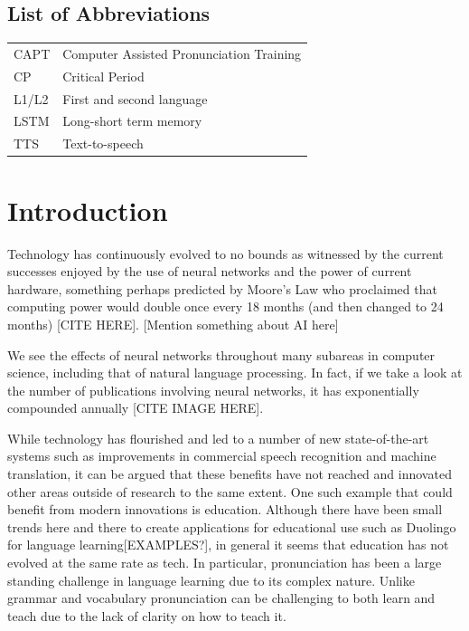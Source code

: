 \documentclass
[
    a4paper,
    twoside,
    12pt
]
{report}
\begin{document}
\section*{List of Abbreviations}\begin{tabular}{ll}
    CAPT    & Computer Assisted Pronunciation Training \\
    CP      & Critical Period \\
    L1/L2    & First and second language \\
    LSTM & Long-short term memory \\
    TTS   & Text-to-speech \\
    
\end{tabular}

\clearpage
\cleardoublepage
{} \setcounter{page}{1}

\chapter{Introduction}

Technology has continuously evolved to no bounds as witnessed by the
current successes enjoyed by the use of neural networks and the power of
current hardware, something perhaps predicted by Moore's Law who
proclaimed that computing power would double once every 18 months (and
then changed to 24 months) {[}CITE HERE{]}. {[}Mention something about
AI here{]}

We see the effects of neural networks throughout many subareas in
computer science, including that of natural language processing. In
fact, if we take a look at the number of publications involving neural
networks, it has exponentially compounded annually {[}CITE IMAGE
HERE{]}.

While technology has flourished and led to a number of new
state-of-the-art systems such as improvements in commercial speech
recognition and machine translation, it can be argued that these
benefits have not reached and innovated other areas outside of research
to the same extent. One such example that could benefit from modern
innovations is education. Although there have been small trends here and
there to create applications for educational use such as Duolingo for
language learning{[}EXAMPLES?{]}, in general it seems that education has
not evolved at the same rate as tech. In particular, pronunciation has
been a large standing challenge in language learning due to its complex
nature. Unlike grammar and vocabulary pronunciation can be challenging
to both learn and teach due to the lack of clarity on how to teach it.
\end{document}
